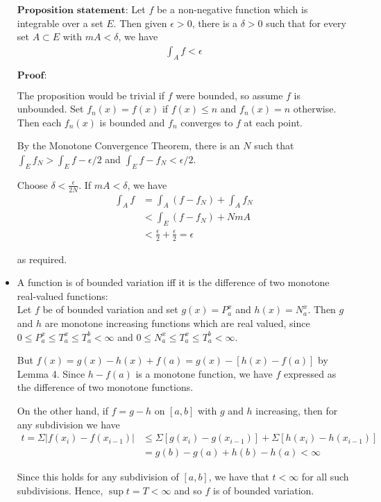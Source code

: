 \documentclass[12pt]{article}
\begin{document}
\begin{itemize}
$\textbf{Proposition statement:}$ Let $f$ be a non-negative function which is integrable over a set $E$. Then given $\epsilon > 0$, there is a $\delta > 0$ such that for every set $A \subset E$ with $mA < \delta$, we have
\begin{align*}
\int_A f < \epsilon
\end{align*}

$\textbf{Proof:}$

The proposition would be trivial if $f$ were bounded, so assume $f$ is unbounded. Set $f_n(x) = f(x)$ if $f(x) \leq n$ and $f_n(x) = n$ otherwise. Then each $f_n(x)$ is bounded and $f_n$ converges to $f$ at each point.

By the Monotone Convergence Theorem, there is an $N$ such that $\int_E f_N > \int_E f - \epsilon/2$ and $\int_E f - f_N < \epsilon/2$.

Choose $\delta < \frac{\epsilon}{2N}$. If $mA < \delta$, we have
\begin{align*}
\int_A f &= \int_A (f - f_N) + \int_A f_N\\
&< \int_E (f - f_N) + NmA\\
&< \frac{\epsilon}{2} + \frac{\epsilon}{2} = \epsilon
\end{align*}

as required.
\\
\item A function is of bounded variation iff it is the difference of two monotone real-valued functions:\\

Let $f$ be of bounded variation and set $g(x) = P^x_a$ and $h(x) = N_a^x$. Then $g$ and $h$ are monotone increasing functions which are real valued, since $0 \leq P_a^x \leq T_a^x \leq T_a^b < \infty$ and $0 \leq N_a^x \leq T_a^x \leq T_a^b < \infty$.

But $f(x) = g(x) - h(x) + f(a) = g(x) - [h(x) - f(a)]$ by Lemma 4. Since $h - f(a)$ is a monotone function, we have $f$ expressed as the difference of two monotone functions.

On the other hand, if $f = g - h$ on $[a, b]$ with $g$ and $h$ increasing, then for any subdivision we have
\begin{align*}
t = \Sigma |f(x_i) - f(x_{i-1})| &\leq \Sigma [g(x_i) - g(x_{i-1})] + \Sigma [h(x_i) - h(x_{i-1})]\\
&= g(b) - g(a) + h(b) - h(a) < \infty
\end{align*}

Since this holds for any subdivision of $[a, b]$, we have that $t < \infty$ for all such subdivisions. Hence, $\sup t = T < \infty$ and so $f$ is of bounded variation.
\end{itemize}
\end{document}
